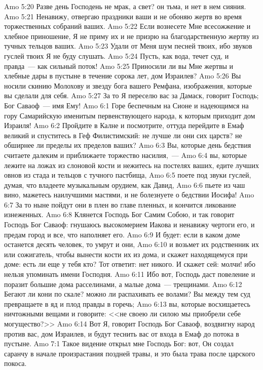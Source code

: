 \vs Amo 5:20 Разве день Господень не мрак, а свет? он тьма, и нет в нем сияния.
\vs Amo 5:21 Ненавижу, отвергаю праздники ваши и не обоняю жертв во время торжественных собраний ваших.
\vs Amo 5:22 Если вознесете Мне всесожжение и хлебное приношение, Я не приму их и не призрю на благодарственную жертву из тучных тельцов ваших.
\vs Amo 5:23 Удали от Меня шум песней твоих, ибо звуков гуслей твоих Я не буду слушать.
\vs Amo 5:24 Пусть, как вода, течет суд, и правда~--- как сильный поток!
\vs Amo 5:25 Приносили ли вы Мне жертвы и хлебные дары в пустыне в течение сорока лет, дом Израилев?
\vs Amo 5:26 Вы носили скинию Молохову и звезду бога вашего Ремфана, изображения, которые вы сделали для себя.
\vs Amo 5:27 За то Я переселю вас за Дамаск, говорит Господь; Бог Саваоф~--- имя Ему!
\vs Amo 6:1 Горе беспечным на Сионе и надеющимся на гору Самарийскую именитым первенствующего народа, к которым приходит дом Израиля!
\vs Amo 6:2 Пройдите в Калне и посмотрите, оттуда перейдите в Емаф великий и спуститесь в Геф Филистимский: не лучше ли они сих царств? не обширнее ли пределы их пределов ваших?
\vs Amo 6:3 Вы, которые день бедствия считаете далеким и приближаете торжество насилия,~---
\vs Amo 6:4 вы, которые лежите на ложах из слоновой кости и нежитесь на постелях ваших, едите лучших овнов из стада и тельцов с тучного пастбища,
\vs Amo 6:5 поете под звуки гуслей, думая, что владеете музыкальным орудием, как Давид,
\vs Amo 6:6 пьете из чаш вино, мажетесь наилучшими мастями, и не болезнуете о бедствии Иосифа!
\vs Amo 6:7 За то ныне пойдут они в плен во главе пленных, и кончится ликование изнеженных.
\vs Amo 6:8 Клянется Господь Бог Самим Собою, и так говорит Господь Бог Саваоф: гнушаюсь высокомерием Иакова и ненавижу чертоги его, и предам город и все, что наполняет его.
\vs Amo 6:9 И будет: если в каком доме останется десять человек, то умрут и они,
\vs Amo 6:10 и возьмет их родственник их или сожигатель, чтобы вынести кости их из дома, и скажет находящемуся при доме: есть ли еще у тебя кто? Тот ответит: нет никого. И скажет сей: молчи! ибо нельзя упоминать имени Господня.
\vs Amo 6:11 Ибо вот, Господь даст повеление и поразит большие дома расселинами, а малые дома~--- трещинами.
\vs Amo 6:12 Бегают ли кони по скале? можно ли распахивать ее волами? Вы между тем суд превращаете в яд и плод правды в горечь;
\vs Amo 6:13 вы, которые восхищаетесь ничтожными вещами и говорите: <<не своею ли силою мы приобрели себе могущество?>>
\vs Amo 6:14 Вот Я, говорит Господь Бог Саваоф, воздвигну народ против вас, дом Израилев, и будут теснить вас от входа в Емаф до потока в пустыне.
\vs Amo 7:1 Такое видение открыл мне Господь Бог: вот, Он создал саранчу в начале произрастания поздней травы, и это была трава после царского покоса.
